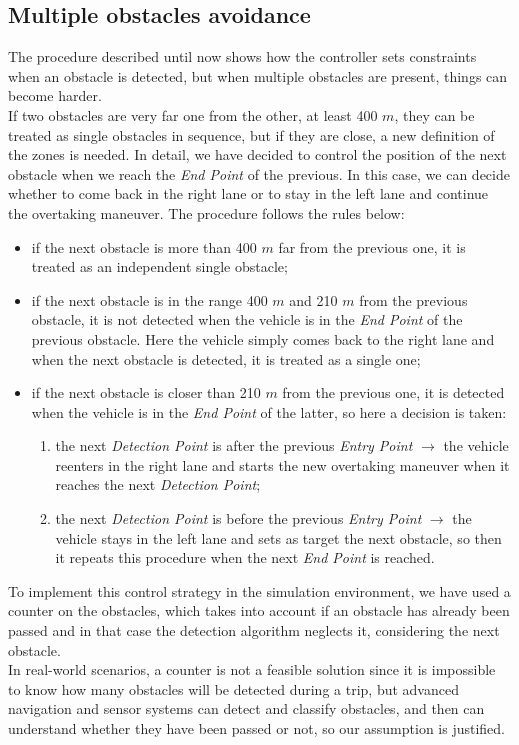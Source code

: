 \subsection{Multiple obstacles avoidance}
The procedure described until now shows how the controller sets constraints when an obstacle is detected, but when multiple obstacles are present, things can become harder.\\
If two obstacles are very far one from the other, at least 400 $m$, they can be treated as single obstacles in sequence, but if they are close, a new definition of the zones is needed. In detail, we have decided to control the position of the next obstacle when we reach the \textit{End Point} of the previous. In this case, we can decide whether to come back in the right lane or to stay in the left lane and continue the overtaking maneuver. The procedure follows the rules below:
\begin{itemize}
    \item if the next obstacle is more than 400 $m$ far from the previous one, it is treated as an independent single obstacle;
    \item if the next obstacle is in the range 400 $m$ and 210 $m$ from the previous obstacle, it is not detected when the vehicle is in the \textit{End Point} of the previous obstacle. Here the vehicle simply comes back to the right lane and when the next obstacle is detected, it is treated as a single one;
    \item if the next obstacle is closer than 210 $m$ from the previous one, it is detected when the vehicle is in the \textit{End Point} of the latter, so here a decision is taken:
    \begin{enumerate}
        \item the next \textit{Detection Point} is after the previous \textit{Entry Point} $\xrightarrow{}$ the vehicle reenters in the right lane and starts the new overtaking maneuver when it reaches the next \textit{Detection Point};
        \item the next \textit{Detection Point} is before the previous \textit{Entry Point} $\xrightarrow{}$ the vehicle stays in the left lane and sets as target the next obstacle, so then it repeats this procedure when the next \textit{End Point} is reached.
    \end{enumerate}
\end{itemize}
To implement this control strategy in the simulation environment, we have used a counter on the obstacles, which takes into account if an obstacle has already been passed and in that case the detection algorithm neglects it, considering the next obstacle.\\
In real-world scenarios, a counter is not a feasible solution since it is impossible to know how many obstacles will be detected during a trip, but advanced navigation and sensor systems can detect and classify obstacles, and then can understand whether they have been passed or not, so our assumption is justified.

